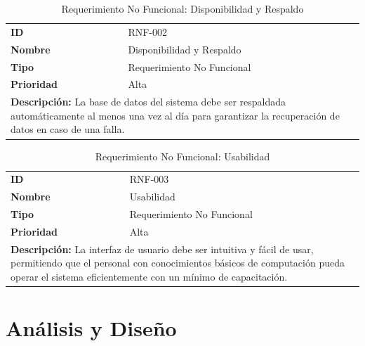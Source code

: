 \documentclass[12pt,letterpaper,spanish]{report}
\begin{document}
\begin{table}[H]
    \centering
    \caption{Requerimiento No Funcional: Disponibilidad y Respaldo}
    \label{tab:rnf002}
    \begin{tabular}{ll}
        \toprule
        \textbf{ID} & RNF-002 \\
        \textbf{Nombre} & Disponibilidad y Respaldo \\
        \textbf{Tipo} & Requerimiento No Funcional \\
        \textbf{Prioridad} & Alta \\
        \midrule
        \multicolumn{2}{l}{
            \parbox{0.9\linewidth}{
                \textbf{Descripción:} La base de datos del sistema debe ser respaldada automáticamente al menos una vez al día para garantizar la recuperación de datos en caso de una falla.
            }
        } \\
        \bottomrule
    \end{tabular}
\end{table}

\begin{table}[H]
    \centering
    \caption{Requerimiento No Funcional: Usabilidad}
    \label{tab:rnf003}
    \begin{tabular}{ll}
        \toprule
        \textbf{ID} & RNF-003 \\
        \textbf{Nombre} & Usabilidad \\
        \textbf{Tipo} & Requerimiento No Funcional \\
        \textbf{Prioridad} & Alta \\
        \midrule
        \multicolumn{2}{l}{
            \parbox{0.9\linewidth}{
                \textbf{Descripción:} La interfaz de usuario debe ser intuitiva y fácil de usar, permitiendo que el personal con conocimientos básicos de computación pueda operar el sistema eficientemente con un mínimo de capacitación.
            }
        } \\
        \bottomrule
    \end{tabular}
\end{table}







\section{Análisis y Diseño}
\end{document}
